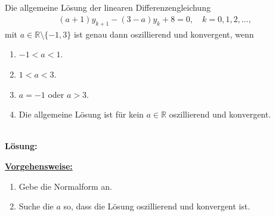 \subsection*{}
Die allgemeine Lösung der linearen Differenzengleichung
\begin{align*}
(a+1) y_{k+1} - (3-a) y_k + 8 = 0, \quad k = 0,1,2,...,
\end{align*}
mit $ a \in \mathbb{R} \setminus \{-1,3  \} $ ist genau dann oszillierend und konvergent, wenn
\renewcommand{\labelenumi}{(\alph{enumi})}
\begin{enumerate}
	\item 
	$ -1 < a < 1 $.
	\item
	$ 1 < a < 3 $.
	\item
	$ a = -1 $ oder $ a > 3 $.
	\item
	Die allgemeine Lösung ist für kein $ a \in \mathbb{R} $ oszillierend und konvergent.
\end{enumerate}
\ \\
\textbf{Lösung:}
\begin{mdframed}
\underline{\textbf{Vorgehensweise:}}
\renewcommand{\labelenumi}{\theenumi.}
\begin{enumerate}
\item Gebe die Normalform an.
\item Suche die $ a $ so, dass die Lösung oszillierend und konvergent ist.
\end{enumerate}
\end{mdframed}

